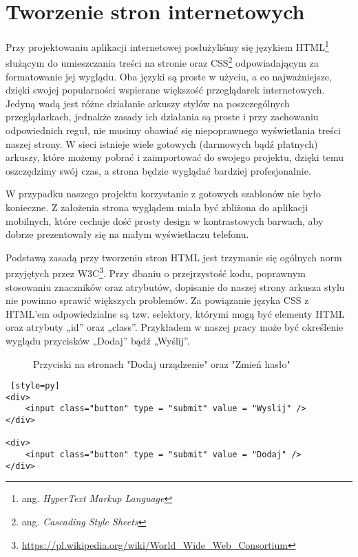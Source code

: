 \documentclass{xmgr}
\begin{document}
\section{Tworzenie stron internetowych}
Przy projektowaniu aplikacji internetowej posłużyliśmy się językiem \newline HTML\cite{seo:2011:SEO}\footnote{ang. \emph{HyperText Markup Language }} służącym do umieszczania treści na stronie oraz CSS\cite{w3c:2018:css}\footnote{ang. \emph{Cascading Style Sheets }} odpowiadającym za formatowanie jej wyglądu. Oba języki są proste w użyciu,  a co najważniejsze, dzięki swojej popularności wspierane większość przeglądarek internetowych. Jedyną wadą jest różne działanie arkuszy stylów na poszczególnych przeglądarkach, jednakże zasady ich działania są proste i przy zachowaniu odpowiednich reguł, nie musimy obawiać się niepoprawnego wyświetlania treści naszej strony. W sieci istnieje wiele gotowych (darmowych bądź płatnych) arkuszy, które możemy pobrać i zaimportować do swojego projektu, dzięki temu oszczędzimy swój czas, a strona będzie wyglądać bardziej profesjonalnie. 

W przypadku naszego projektu korzystanie z gotowych szablonów nie było konieczne. Z założenia strona wyglądem miała być zbliżona do aplikacji mobilnych, które cechuje dość prosty design w kontrastowych barwach, aby dobrze prezentowały się na małym wyświetlaczu telefonu.

Podstawą zasadą przy tworzeniu stron HTML jest trzymanie się ogólnych norm przyjętych przez W3C\footnote{\url{https://pl.wikipedia.org/wiki/World_Wide_Web_Consortium}}. Przy dbaniu o przejrzystość kodu, poprawnym stosowaniu znaczników oraz atrybutów, dopisanie do naszej strony arkusza stylu nie powinno sprawić większych problemów. Za powiązanie języka CSS z HTML’em odpowiedzialne są tzw. selektory, którymi mogą być elementy HTML oraz atrybuty „id” oraz „class”. Przykładem w naszej pracy może być określenie wyglądu przycisków „Dodaj” bądź „Wyślij”.

\hspace{2cm}
\begin{figure}[h]
\centering
{}
\quad
{}
\quad
\caption{Przyciski na stronach "Dodaj urządzenie" oraz "Zmień hasło"}
\end{figure}

\begin{lstlisting} [style=py]
<div>
	<input class="button" type = "submit" value = "Wyslij" />
</div>

<div>
	<input class="button" type = "submit" value = "Dodaj" />
</div>
\end{lstlisting}
\end{document}
